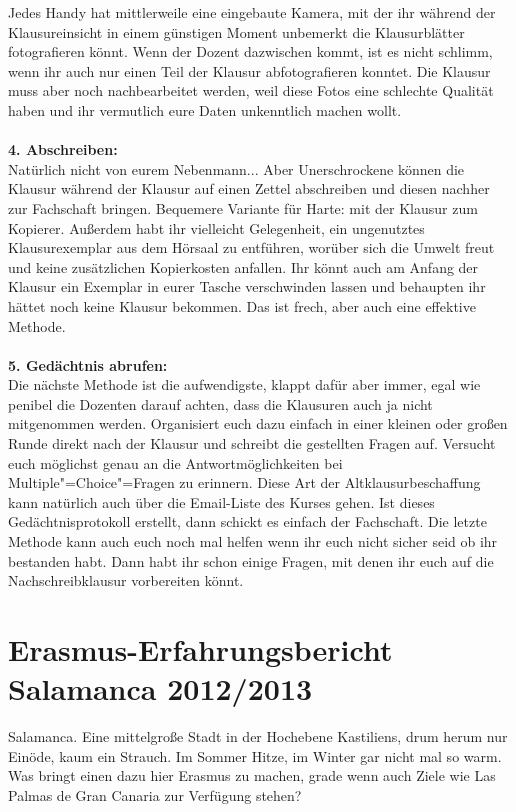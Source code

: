 Jedes Handy hat mittlerweile eine eingebaute Kamera, mit der ihr während der Klausureinsicht in einem günstigen Moment unbemerkt die Klausurblätter fotografieren könnt. Wenn der Dozent dazwischen kommt, ist es nicht schlimm, wenn ihr auch nur einen Teil der Klausur abfotografieren konntet. Die Klausur muss aber noch nachbearbeitet werden, weil diese Fotos eine schlechte Qualität haben und ihr vermutlich eure Daten unkenntlich machen wollt.\\
\\
\textbf{4. Abschreiben:}\\
Natürlich nicht von eurem Nebenmann... Aber Unerschrockene können die Klausur während der Klausur auf einen Zettel abschreiben und diesen nachher zur Fachschaft bringen. Bequemere Variante für Harte: mit der Klausur zum Kopierer. Außerdem habt ihr vielleicht Gelegenheit, ein ungenutztes Klausurexemplar aus dem Hörsaal zu entführen, worüber sich die Umwelt freut und keine zusätzlichen Kopierkosten anfallen. Ihr könnt auch am Anfang der Klausur ein Exemplar in eurer Tasche verschwinden lassen und behaupten ihr hättet noch keine Klausur bekommen. Das ist frech, aber auch eine effektive Methode.\\
\\
\textbf{5. Gedächtnis abrufen:}\\
Die nächste Methode ist die aufwendigste, klappt dafür aber immer, egal wie penibel die Dozenten darauf achten, dass die Klausuren auch ja nicht mitgenommen werden. Organisiert euch dazu einfach in einer kleinen oder großen Runde direkt nach der Klausur und schreibt die gestellten Fragen auf. Versucht euch möglichst genau an die Antwortmöglichkeiten bei Multiple"=Choice"=Fragen zu erinnern. Diese Art der Altklausurbeschaffung kann natürlich auch über die Email-Liste des Kurses gehen. Ist dieses Gedächtnisprotokoll erstellt, dann schickt es einfach der Fachschaft. 
Die letzte Methode kann auch euch noch mal helfen wenn ihr euch nicht sicher seid ob ihr bestanden habt. Dann habt ihr schon einige Fragen, mit denen ihr euch auf die Nachschreibklausur vorbereiten könnt. 

\section{Erasmus-Erfahrungsbericht Salamanca 2012/2013}

Salamanca. Eine mittelgroße Stadt in der Hochebene Kastiliens, drum herum nur Einöde, kaum ein Strauch. Im Sommer Hitze, im Winter gar nicht mal so warm. Was bringt einen dazu hier Erasmus zu machen, grade wenn auch Ziele wie Las Palmas de Gran Canaria zur Verfügung stehen? 

